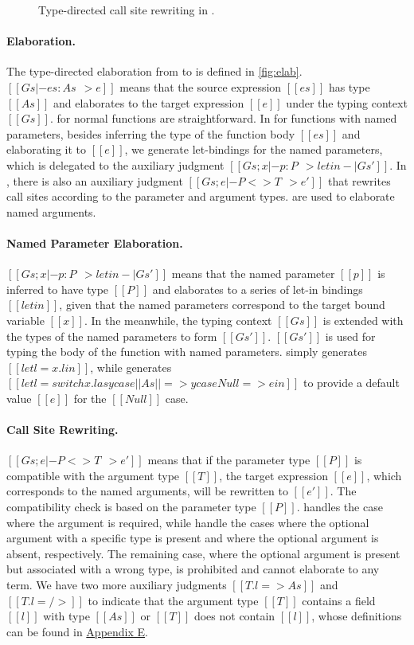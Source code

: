 \begin{figure}
\IUdefnpmatch{}
\caption{Type-directed call site rewriting in \uaena.} \label{fig:match}
\end{figure}

\paragraph{Elaboration.}
The type-directed elaboration from \uaena to \lambdaiu is defined in
\autoref{fig:elab}. $[[Gs |- es : As ~~> e]]$ means that the source
expression $[[es]]$ has type $[[As]]$ and elaborates to the target expression
$[[e]]$ under the typing context $[[Gs]]$.  for normal
functions are straightforward. In  for functions with named
parameters, besides inferring the type of the function body $[[es]]$ and
elaborating it to $[[e]]$, we generate let-bindings for the named parameters,
which is delegated to the auxiliary judgment $[[Gs; x |- p : P ~~> letin -| Gs']]$.
In , there is also an auxiliary judgment $[[Gs; e |- P <> T ~~> e']]$
that rewrites call sites according to the parameter and argument types.
 are used to elaborate named arguments.

\paragraph{Named Parameter Elaboration.}
$[[Gs; x |- p : P ~~> letin -| Gs']]$ means that the named parameter
$[[p]]$ is inferred to have type $[[P]]$ and elaborates to a series of let-in
bindings $[[letin]]$, given that the named parameters correspond to the target
bound variable $[[x]]$. In the meanwhile, the typing context $[[Gs]]$ is extended
with the types of the named parameters to form $[[Gs']]$. $[[Gs']]$ is used for
typing the body of the function with named parameters. 
simply generates $[[let l = x.l in]]$, while  generates
$[[let l = switch x.l as y case ||As|| => y case Null => e in]]$ to provide a
default value $[[e]]$ for the $[[Null]]$ case.

\paragraph{Call Site Rewriting.}
$[[Gs; e |- P <> T ~~> e']]$ means that if the parameter type
$[[P]]$ is compatible with the argument type $[[T]]$, the target expression
$[[e]]$, which corresponds to the named arguments, will be rewritten to
$[[e']]$. The compatibility check is based on the parameter type $[[P]]$.
 handles the case where the argument is required, while
 handle the cases where the optional argument
with a specific type is present and where the optional argument is absent,
respectively. The remaining case, where the optional argument is present but
associated with a wrong type, is prohibited and cannot elaborate to any term.
We have two more auxiliary judgments $[[T.l => As]]$ and
$[[T.l =/>]]$ to indicate that the argument type $[[T]]$ contains a field $[[l]]$
with type $[[As]]$ or $[[T]]$ does not contain $[[l]]$, whose definitions can be found in
\hyperref[sec:appendix-lookup]{Appendix E}.

